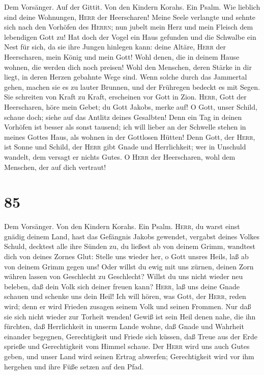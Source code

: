  Dem Vorsänger. Auf der Gittit. Von den Kindern Korahs.
Ein Psalm. Wie lieblich sind deine Wohnungen, \textsc{Herr} der
Heerscharen!  Meine Seele verlangte und sehnte sich nach
den Vorhöfen des \textsc{Herrn}; nun jubelt mein Herz und mein Fleisch
dem lebendigen Gott zu!  Hat doch der Vogel ein Haus
gefunden und die Schwalbe ein Nest für sich, da sie ihre Jungen hinlegen
kann: deine Altäre, \textsc{Herr} der Heerscharen, mein König und mein
Gott!  Wohl denen, die in deinem Hause wohnen, die werden
dich noch preisen!  Wohl den Menschen, deren Stärke in dir
liegt, in deren Herzen gebahnte Wege sind.  Wenn solche
durch das Jammertal gehen, machen sie es zu lauter Brunnen, und der
Frühregen bedeckt es mit Segen.  Sie schreiten von Kraft
zu Kraft, erscheinen vor Gott in Zion.  \textsc{Herr},
Gott der Heerscharen, höre mein Gebet; du Gott Jakobs, merke auf!
 O Gott, unser Schild, schaue doch; siehe auf das Antlitz
deines Gesalbten!  Denn ein Tag in deinen Vorhöfen ist
besser als sonst tausend; ich will lieber an der Schwelle stehen in
meines Gottes Haus, als wohnen in der Gottlosen Hütten! 
Denn Gott, der \textsc{Herr}, ist Sonne und Schild, der \textsc{Herr}
gibt Gnade und Herrlichkeit; wer in Unschuld wandelt, dem versagt er
nichts Gutes.  O \textsc{Herr} der Heerscharen, wohl dem
Menschen, der auf dich vertraut!

\hypertarget{section-84}{%
\section{85}\label{section-84}}

 Dem Vorsänger. Von den Kindern Korahs. Ein Psalm.
\textsc{Herr}, du warst einst gnädig deinem Land, hast das Gefängnis
Jakobs gewendet,  vergabst deines Volkes Schuld, decktest
alle ihre Sünden zu,  du ließest ab von deinem Grimm,
wandtest dich von deines Zornes Glut:  Stelle uns wieder
her, o Gott unsres Heils, laß ab von deinem Grimm gegen uns!
 Oder willst du ewig mit uns zürnen, deinen Zorn währen
lassen von Geschlecht zu Geschlecht?  Willst du uns nicht
wieder neu beleben, daß dein Volk sich deiner freuen kann?
 \textsc{Herr}, laß uns deine Gnade schauen und schenke
uns dein Heil!  Ich will hören, was Gott, der
\textsc{Herr}, reden wird; denn er wird Frieden zusagen seinem Volk und
seinen Frommen. Nur daß sie sich nicht wieder zur Torheit wenden!
 Gewiß ist sein Heil denen nahe, die ihn fürchten, daß
Herrlichkeit in unserm Lande wohne,  daß Gnade und
Wahrheit einander begegnen, Gerechtigkeit und Friede sich küssen,
 daß Treue aus der Erde sprieße und Gerechtigkeit vom
Himmel schaue.  Der \textsc{Herr} wird uns auch Gutes
geben, und unser Land wird seinen Ertrag abwerfen; 
Gerechtigkeit wird vor ihm hergehen und ihre Füße setzen auf den Pfad.

